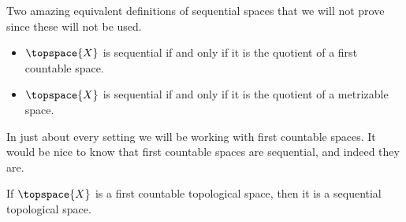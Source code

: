 \documentclass{article}                                                        %
\begin{document}
            Two amazing equivalent definitions of sequential spaces that we will not
            prove since these will not be used.
            \begin{itemize}
                \item $\topspace{X}$ is sequential if and only if it is the quotient
                    of a first countable space.
                \item $\topspace{X}$ is sequential if and only if it is the quotient
                    of a metrizable space.
            \end{itemize}
            In just about every setting we will be working with first countable
            spaces. It would be nice to know that first countable spaces are
            sequential, and indeed they are.
            \begin{theorem}
                \label{thm:First_Countable_Implies_Sequential}%
                If $\topspace{X}$ is a first countable topological space, then it
                is a sequential topological space.
            \end{theorem}
\end{document}
